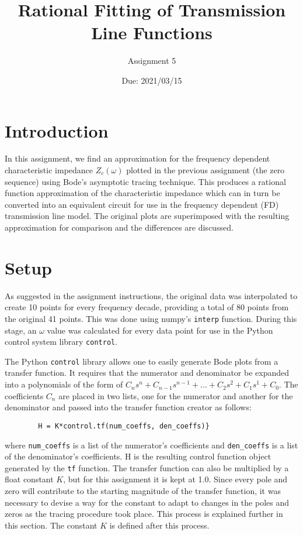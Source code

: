 \documentclass[10pt, oneside, letterpaper]{article}
\title{Rational Fitting of Transmission Line Functions}
\author{Assignment 5}
\date{Due: 2021/03/15}
\begin{document}
\maketitle
\thispagestyle{fancy}

\section{Introduction}

In this assignment, we find an approximation for the frequency dependent characteristic impedance $Z_c(\omega{})$ plotted in the previous assignment (the zero sequence) using Bode's asymptotic tracing technique. This produces a rational function approximation of the characteristic impedance which can in turn be converted into an equivalent circuit for use in the frequency dependent (FD) transmission line model. The original plots are superimposed with the resulting approximation for comparison and the differences are discussed.

\section{Setup}

As suggested in the assignment instructions, the original data was interpolated to create 10 points for every frequency decade, providing a total of 80 points from the original 41 points. This was done using numpy's \texttt{interp} function. During this stage, an $\omega$ value was calculated for every data point for use in the Python control system library \texttt{control}.

The Python \texttt{control} library allows one to easily generate Bode plots from a transfer function. It requires that the numerator and denominator be expanded into a polynomials of the form of $C_{n}s^n + C_{n-1}s^{n-1} + ... + C_2s^2 + C_1s^1 + C_0$. The coefficients $C_n$ are placed in two lists, one for the numerator and another for the denominator and passed into the transfer function creator as follows:

\begin{lstlisting}
        H = K*control.tf(num_coeffs, den_coeffs)}
\end{lstlisting}

where \texttt{num\_coeffs} is a list of the numerator's coefficients and \texttt{den\_coeffs} is a list of the denominator's coefficients. H is the resulting control function object generated by the \texttt{tf} function. The transfer function can also be multiplied by a float constant $K$, but for this assignment it is kept at 1.0. Since every pole and zero will contribute to the starting magnitude of the transfer function, it was necessary to devise a way for the constant to adapt to changes in the poles and zeros as the tracing procedure took place. This process is explained further in this section. The constant $K$ is defined after this process.
\end{document}
